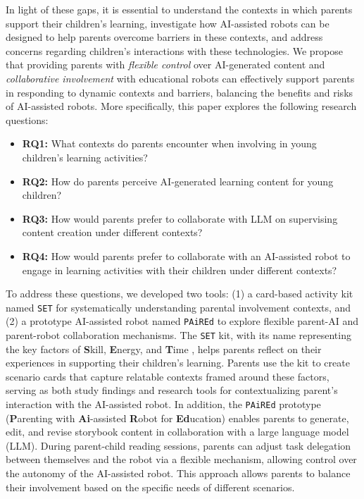 In light of these gaps, it is essential to understand the contexts in which parents support their children's learning, investigate how AI-assisted robots can be designed to help parents overcome barriers in these contexts, and address concerns regarding children's interactions with these technologies. We propose that providing parents with \textit{flexible control} over AI-generated content and \textit{collaborative involvement} with educational robots can effectively support parents in responding to dynamic contexts and barriers, balancing the benefits and risks of AI-assisted robots. More specifically, this paper explores the following research questions:
\begin{itemize}
    \itemsep0.4em
    \item \textbf{RQ1:} What contexts do parents encounter when involving in young children's learning activities?
    \item \textbf{RQ2:} How do parents perceive AI-generated learning content for young children?
    \item \textbf{RQ3:} How would parents prefer to collaborate with LLM on supervising content creation under different contexts?
\end{itemize}

\begin{itemize}
    \item \textbf{RQ4:} How would parents prefer to collaborate with an AI-assisted robot to engage in learning activities with their children under different contexts?
\end{itemize}

To address these questions, we developed two tools: (1) a card-based activity kit named \texttt{SET} for systematically understanding parental involvement contexts, and (2) a prototype AI-assisted robot named \texttt{PAiREd} to explore flexible parent-AI and parent-robot collaboration mechanisms. The \texttt{SET} kit, with its name representing the key factors of \textbf{S}kill, \textbf{E}nergy, and \textbf{T}ime \cite{ho2024s, green2007parents}, helps parents reflect on their experiences in supporting their children's learning. Parents use the kit to create scenario cards that capture relatable contexts framed around these factors, serving as both study findings and research tools for contextualizing parent's interaction with the AI-assisted robot. In addition, the \texttt{PAiREd} prototype (\textbf{P}arenting with \textbf{Ai}-assisted \textbf{R}obot for \textbf{Ed}ucation) enables parents to generate, edit, and revise storybook content in collaboration with a large language model (LLM). During parent-child reading sessions, parents can adjust task delegation between themselves and the robot via a flexible mechanism, allowing control over the autonomy of the AI-assisted robot. This approach allows parents to balance their involvement based on the specific needs of different scenarios.

